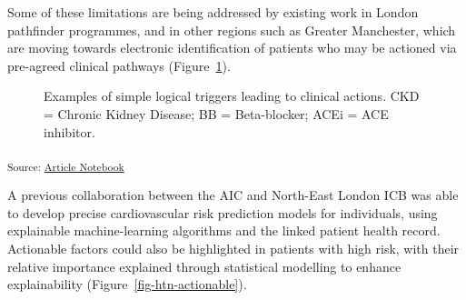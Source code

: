\documentclass[
  letterpaper,
  DIV=11,
  numbers=noendperiod]{scrartcl}
\begin{document}
Some of these limitations are being addressed by existing work in London
pathfinder programmes, and in other regions such as Greater Manchester,
which are moving towards electronic identification of patients who may
be actioned via pre-agreed clinical pathways
(Figure~\ref{fig-simple-pathway-action}).

\begin{figure}


\caption{\label{fig-simple-pathway-action}Examples of simple logical
triggers leading to clinical actions. CKD = Chronic Kidney Disease; BB =
Beta-blocker; ACEi = ACE inhibitor.}

\end{figure}%

\textsubscript{Source:
\href{https://d3london.github.io/sde_aic_docs/index.qmd.html}{Article
Notebook}}

A previous collaboration between the AIC and North-East London ICB was
able to develop precise cardiovascular risk prediction models for
individuals, using explainable machine-learning algorithms and the
linked patient health record. Actionable factors could also be
highlighted in patients with high risk, with their relative importance
explained through statistical modelling to enhance explainability
(Figure~\ref{fig-htn-actionable}).
\end{document}
